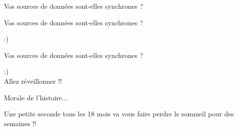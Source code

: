 \documentclass[]{beamer}
\begin{document}
\begin{frame}[fragile]{Vos sources de données sont-elles synchrones ?}
\end{frame}

\begin{frame}[fragile]{Vos sources de données sont-elles synchrones ?}
    \begin{center}
        \Huge{:)}
    \end{center}
\end{frame}

\begin{frame}[fragile]{Vos sources de données sont-elles synchrones ?}
    \begin{center}
        \Huge{:)\\ Allez réveillonner !!}
    \end{center}
\end{frame}

\begin{frame}[fragile]{Morale de l'histoire...}
    \begin{center}
        \huge{Une petite seconde tous les 18 mois va vous faire perdre le sommeil
        pour des semaines !!}
    \end{center}
\end{frame}
\end{document}
